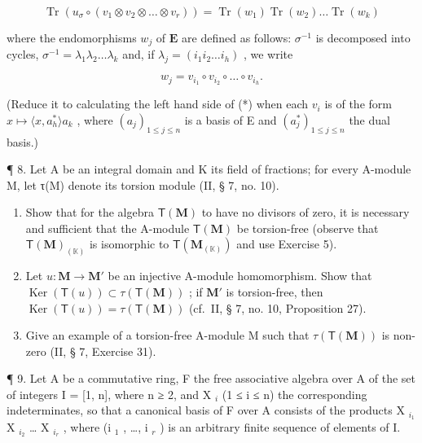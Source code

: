 \[
\operatorname{Tr} (u _ {\sigma} \circ (v _ {1} \otimes v _ {2} \otimes \dots \otimes v _ {r})) = \operatorname{Tr} (w _ {1}) \operatorname{Tr} (w _ {2}) \dots \operatorname{Tr} (w _ {k})\tag{*}
\]

where the endomorphisms \(w_{j}\) of \(\mathbf{E}\) are defined as follows: \(\sigma^{-1}\) is decomposed into cycles, \(\sigma^{-1} = \lambda_1\lambda_2\ldots \lambda_k\) and, if \(\lambda_{j} = (i_{1}i_{2}\dots i_{h})\) , we write

\[
w _ {j} = v _ {i _ {1}} \circ v _ {i _ {2}} \circ \dots \circ v _ {i _ {h}}.
\]

(Reduce it to calculating the left hand side of (*) when each \(v_{i}\) is of the form \(x \mapsto \langle x, a_{h}^{*} \rangle a_{k}\) , where \((a_{j})_{1 \leqslant j \leqslant n}\) is a basis of E and \((a_{j}^{*})_{1 \leqslant j \leqslant n}\) the dual basis.)

¶ 8. Let A be an integral domain and K its field of fractions; for every A-module M, let τ(M) denote its torsion module (II, § 7, no. 10).

\begin{enumerate}
\def\labelenumi{(\alph{enumi})}
\item
  Show that for the algebra \(\mathsf{T}(\mathbf{M})\) to have no divisors of zero, it is necessary and sufficient that the A-module \(\mathsf{T}(\mathbf{M})\) be torsion-free (observe that \(\mathsf{T}(\mathbf{M})_{(\mathbb{K})}\) is isomorphic to \(\mathsf{T}(\mathbf{M}_{(\mathbb{K})})\) and use Exercise 5).
\item
  Let \(u: \mathbf{M} \to \mathbf{M}'\) be an injective A-module homomorphism. Show that \(\operatorname{Ker}(\mathsf{T}(u)) \subset \tau(\mathsf{T}(\mathbf{M}))\) ; if \(\mathbf{M}'\) is torsion-free, then \(\operatorname{Ker}(\mathsf{T}(u)) = \tau(\mathsf{T}(\mathbf{M}))\) (cf.~II, § 7, no. 10, Proposition 27).
\item
  Give an example of a torsion-free A-module M such that \(\tau(\mathsf{T}(\mathbf{M}))\) is non-zero (II, § 7, Exercise 31).
\end{enumerate}

¶ 9. Let A be a commutative ring, F the free associative algebra over A of the set of integers I = {[}1, n{]}, where n ≥ 2, and X \(_{i}\) (1 ≤ i ≤ n) the corresponding indeterminates, so that a canonical basis of F over A consists of the products X \(_{i_1}\) X \(_{i_2}\) \ldots{} X \(_{i_r}\) , where (i \(_{1}\) , \ldots, i \(_{r}\) ) is an arbitrary finite sequence of elements of I.

